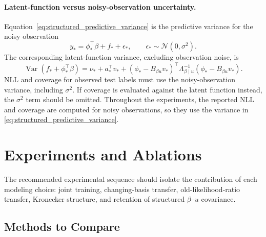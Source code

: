 \documentclass[12pt]{article}
\newcommand{\Var}{\operatorname{Var}}
\begin{document}
\paragraph{Latent-function versus noisy-observation uncertainty.}
Equation~\eqref{eq:structured_predictive_variance} is the predictive variance
for the noisy observation
\[
    y_*=\phi_*^\top\beta+f_*+\epsilon_*,
    \qquad
    \epsilon_*\sim\mathcal{N}(0,\sigma^2).
\]
The corresponding latent-function variance, excluding observation noise, is
\begin{equation}
    \Var(f_*+\phi_*^\top\beta)
    =
    \nu_*+
    a_*^\top v_*
    +
    \left(\phi_*-B_{\beta u}v_*\right)^\top
    \Lambda_{\beta\mid u}^{-1}
    \left(\phi_*-B_{\beta u}v_*\right).
    \label{eq:latent_predictive_variance}
\end{equation}
NLL and coverage for observed test labels must use the noisy-observation
variance, including \(\sigma^2\).  If coverage is evaluated against the latent
function instead, the \(\sigma^2\) term should be omitted.  Throughout the
experiments, the reported NLL and coverage are computed for noisy observations,
so they use the variance in
\eqref{eq:structured_predictive_variance}.

\section{Experiments and Ablations}
\label{sec:experiments_ablations}

The recommended experimental sequence should isolate the contribution of each modeling
choice: joint training, changing-basis transfer, old-likelihood-ratio transfer,
Kronecker structure, and retention of structured $\beta$--$u$ covariance.

\subsection{Methods to Compare}
\end{document}
